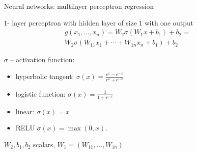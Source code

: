 \documentclass{beamer}
\begin{document}
\begin{frame}[fragile]{Neural networks: multilayer perceptron regression}

 $1$- layer perceptron with hidden layer of size $1$ with one output
       \[ 
          \begin{split}
            g(x_1,\ldots,x_n)=W_2 \sigma(W_1 x + b_1)+b_2 = \\
           W_2\sigma(W_{11}x_1+\cdots + W_{1n}x_n+b_1)+b_2 
         \end{split}
      \]


$\sigma$ -- activation function: 

\begin{itemize}
\item hyperbolic tangent:   $\sigma(x)=\frac{e^x-e^{-x}}{e^x+e^{-x}}$ 

\item logistic function:  $\sigma(x)=\frac{1}{1+e^{-x}}$

\item linear:  $\sigma(x)=x$

\item RELU $\sigma(x)=\max(0,x)$. 

\end{itemize}

 $W_2,b_1,b_2$ scalars, $W_1=(W_{11},\ldots,W_{1n})$ 


\end{frame}
\end{document}
